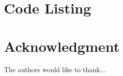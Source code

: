 \documentclass[journal]{IEEEtran}
\begin{document}

%


\appendices
\section{Code Listing}






\section*{Acknowledgment}


The authors would like to thank...


\ifCLASSOPTIONcaptionsoff
  \newpage
\fi



\end{document}
